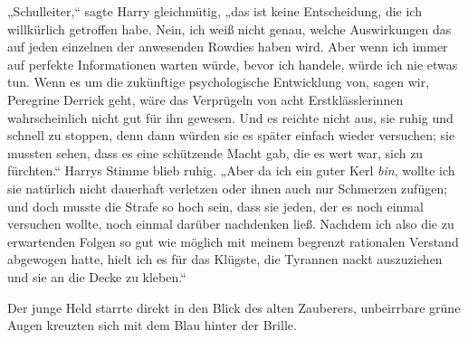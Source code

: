 „Schulleiter,“ sagte Harry gleichmütig, „das ist keine Entscheidung, die ich willkürlich getroffen habe. Nein, ich weiß nicht genau, welche Auswirkungen das auf jeden einzelnen der anwesenden Rowdies haben wird. Aber wenn ich immer auf perfekte Informationen warten würde, bevor ich handele, würde ich nie etwas tun. Wenn es um die zukünftige psychologische Entwicklung von, sagen wir, Peregrine Derrick geht, wäre das Verprügeln von acht Erstklässlerinnen wahrscheinlich nicht gut für ihn gewesen. Und es reichte nicht aus, sie ruhig und schnell zu stoppen, denn dann würden sie es später einfach wieder versuchen; sie mussten sehen, dass es eine schützende Macht gab, die es wert war, sich zu fürchten.“ Harrys Stimme blieb ruhig. „Aber da ich ein guter Kerl \emph{bin}, wollte ich sie natürlich nicht dauerhaft verletzen oder ihnen auch nur Schmerzen zufügen; und doch musste die Strafe so hoch sein, dass sie jeden, der es noch einmal versuchen wollte, noch einmal darüber nachdenken ließ. Nachdem ich also die zu erwartenden Folgen so gut wie möglich mit meinem begrenzt rationalen Verstand abgewogen hatte, hielt ich es für das Klügste, die Tyrannen nackt auszuziehen und sie an die Decke zu kleben.“

Der junge Held starrte direkt in den Blick des alten Zauberers, unbeirrbare grüne Augen kreuzten sich mit dem Blau hinter der Brille.

